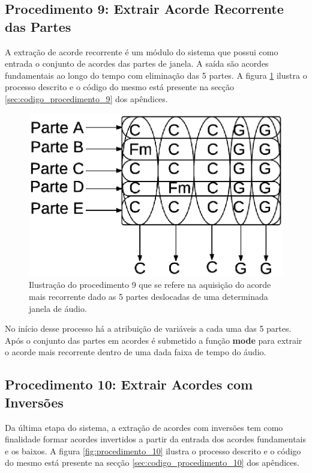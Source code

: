 \subsection{Procedimento 9: Extrair Acorde Recorrente das Partes}
\label{subsec:procedimento_9}

A extração de acorde recorrente é um módulo do sistema que possui como entrada o conjunto de acordes das partes de janela. A saída são acordes fundamentais ao longo do tempo com eliminação das 5 partes. A figura \ref{fig:procedimento_9} ilustra o processo descrito e o código do mesmo está presente na secção \ref{sec:codigo_procedimento_9} dos apêndices.

\begin{figure}[h] 
  \centering
    \includegraphics[keepaspectratio=true, scale=0.55]{figuras/procedimento_9}
    \caption{Ilustração do procedimento 9 que se refere na aquisição do acorde mais recorrente dado as 5 partes deslocadas de uma determinada janela de áudio.}
    \label{fig:procedimento_9}
\end{figure}

No início desse processo há a atribuição de variáveis a cada uma das 5 partes. Após o conjunto das partes em acordes é submetido a função \textbf{mode} para extrair o acorde mais recorrente dentro de uma dada faixa de tempo do áudio.


\subsection{Procedimento 10: Extrair Acordes com Inversões}
\label{subsec:procedimento_10}

Da última etapa do sistema, a extração de acordes com inversões tem como finalidade formar acordes invertidos a partir da entrada dos acordes fundamentais e os baixos. A figura \ref{fig:procedimento_10} ilustra o processo descrito e o código do mesmo está presente na secção \ref{sec:codigo_procedimento_10} dos apêndices.

